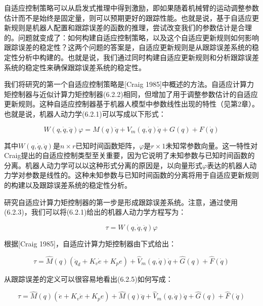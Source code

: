 \documentclass[12pt,a4paper]{ctexart}
\begin{document}
自适应控制策略可以从启发式推理中得到激励，即如果随着机械臂的运动调整参数估计而不是始终是固定量，则可以预期更好的跟踪性能。也就是说，基于自适应更新规则是机器人配置和跟踪误差的函数的推理，尝试改变我们的参数估计是合理的。问题就变成了：如何构建自适应控制策略，以及这个自适应更新规则如何影响跟踪误差的稳定性？这两个问题的答案是，自适应更新规则是从跟踪误差系统的稳定性分析中构建的。也就是说，我们通过同时构建自适应更新规则和分析跟踪误差系统的稳定性来确保跟踪误差系统的稳定性。

我们将研究的第一个自适应控制策略是[Craig 1985]中概述的方法。自适应计算力矩控制器与近似计算力矩控制器(6.2.2)相同，但增加了用于调整参数估计的自适应更新规则。这种自适应控制器基于机器人模型中参数线性出现的特性（见第2章）。也就是说，机器人动力学(6.2.1)可以写成以下形式：

\begin{equation}\label{eq:6.2.3}
W(q,\dot{q},\ddot{q})\varphi = M(q)\ddot{q} + V_m(q,\dot{q})\dot{q} + G(q) + F(\dot{q})
\end{equation}

其中$W(q, \dot{q}, \ddot{q})$是$n \times r$已知时间函数矩阵，$\varphi$是$r \times 1$未知常参数向量。这一特性对Craig提出的自适应控制类型至关重要，因为它说明了未知参数与已知时间函数的分离。机器人动力学可以以这种形式分离的原因是，以向量形式$\varphi$表达的机器人动力学对参数是线性的。这种未知参数与已知时间函数的分离将用于自适应更新规则的构建以及跟踪误差系统的稳定性分析。

研究自适应计算力矩控制器的第一步是形成跟踪误差系统。注意，通过使用(6.2.3)，我们可以将(6.2.1)给出的机器人动力学方程写为：

\begin{equation}\label{eq:6.2.4}
\tau = W(q, \dot{q}, \ddot{q}) \varphi
\end{equation}

根据[Craig 1985]，自适应计算力矩控制器由下式给出：

\begin{equation}\label{eq:6.2.5}
\tau = \hat{M}(q)(\ddot{q}_d + K_v \dot{e} + K_p e) + \hat{V}_m(q, \dot{q})\dot{q} + \hat{G}(q) + \hat{F}(\dot{q})
\end{equation}

从跟踪误差的定义可以很容易地看出(6.2.5)如何写成：

\begin{equation}\label{eq:6.2.6}
\tau = \hat{M}(q)(\ddot{e} + K_v \dot{e} + K_p e) + \hat{M}(q)\ddot{q} + \hat{V}_m(q, \dot{q})\dot{q} + \hat{G}(q) + \hat{F}(\dot{q})
\end{equation}
\end{document}
